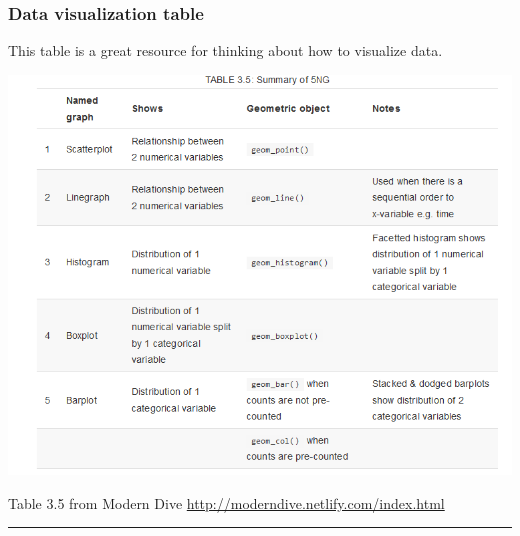 \documentclass[]{article}
\begin{document}
\hypertarget{data-visualization-table}{%
\subsubsection{Data visualization
table}\label{data-visualization-table}}

This table is a great resource for thinking about how to visualize data.

\includegraphics{figures/graph.table.png}

Table 3.5 from Modern Dive
\url{http://moderndive.netlify.com/index.html}

\begin{center}\rule{0.5\linewidth}{0.5pt}\end{center}
\end{document}
